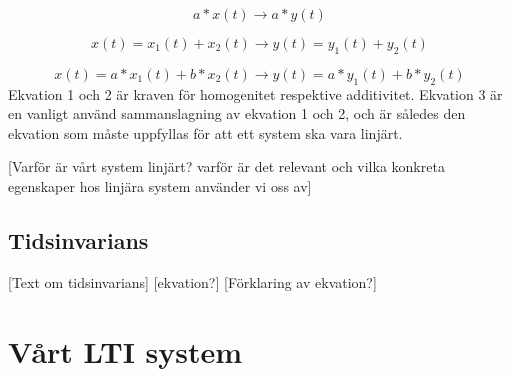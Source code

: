 \documentclass[10pt,a4paper]{article}
\begin{document}
\begin{equation}
a*x(t) \rightarrow a*y(t) 
\end{equation}

\begin{equation}
x(t) = x_1(t) + x_2(t) \rightarrow y(t) = y_1(t) + y_2(t)
\end{equation}

\begin{equation}
x(t) = a*x_1(t) + b*x_2(t)\rightarrow y(t) = a*y_1(t) + b*y_2(t)
\end{equation}
\linebreak
Ekvation 1 och 2 är kraven för homogenitet respektive additivitet. Ekvation 3 är en vanligt använd sammanslagning av ekvation 1 och 2, och är således den ekvation som måste uppfyllas för att ett system ska vara linjärt.

[Varför är vårt system linjärt? varför är det relevant och vilka konkreta egenskaper hos linjära system använder vi oss av]

\subsection{Tidsinvarians}

[Text om tidsinvarians]
[ekvation?]
[Förklaring av ekvation?]

\newpage
\section{Vårt LTI system}
\end{document}
